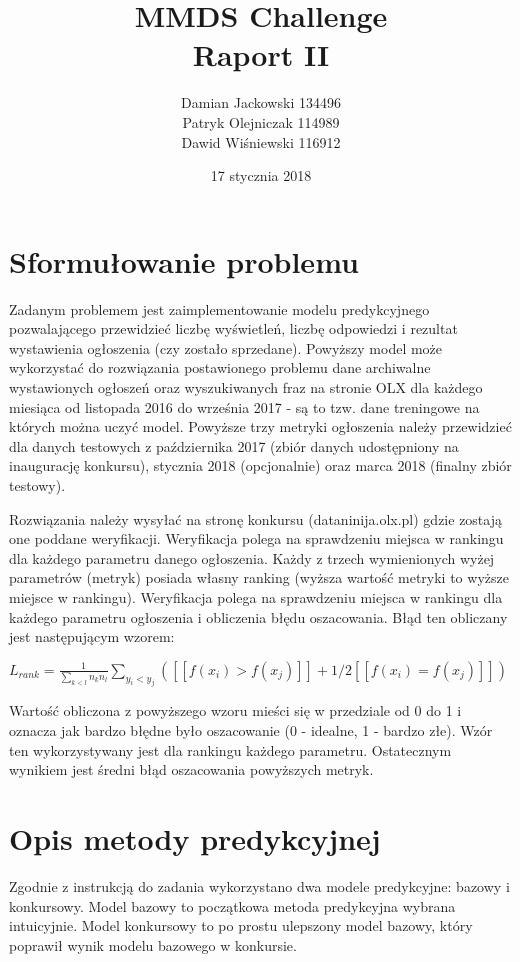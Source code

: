 \documentclass[a4paper,11pt]{article}
\author{Damian Jackowski 134496 \\ Patryk Olejniczak 114989 \\ Dawid Wiśniewski 116912}
\title{MMDS Challenge\\
	\large{{\bf Raport II}  }}
\date{17 stycznia 2018}
\begin{document}
\maketitle 


\section{Sformułowanie problemu}

Zadanym problemem jest zaimplementowanie modelu predykcyjnego pozwalającego przewidzieć  liczbę wyświetleń, liczbę odpowiedzi i rezultat wystawienia ogłoszenia (czy zostało sprzedane). Powyższy model może wykorzystać do rozwiązania postawionego problemu dane archiwalne wystawionych ogłoszeń oraz wyszukiwanych fraz na stronie OLX dla każdego miesiąca od listopada 2016 do września 2017 - są to tzw. dane treningowe na których można uczyć model. Powyższe trzy metryki ogłoszenia należy przewidzieć dla danych testowych z października 2017 (zbiór danych udostępniony na inaugurację konkursu), stycznia 2018 (opcjonalnie) oraz marca 2018 (finalny zbiór testowy).

Rozwiązania należy wysyłać na stronę konkursu (dataninija.olx.pl) gdzie zostają one poddane weryfikacji. Weryfikacja polega na sprawdzeniu miejsca w rankingu dla każdego parametru danego ogłoszenia. Każdy z trzech wymienionych wyżej parametrów (metryk) posiada własny ranking (wyższa wartość metryki to wyższe miejsce w rankingu). Weryfikacja polega na sprawdzeniu miejsca w rankingu dla każdego parametru ogłoszenia i obliczenia błędu oszacowania. Błąd ten obliczany jest następującym wzorem:

$L_{rank} = \frac{1}{\sum_{k < l} n_k n_l} \sum_{y_i < y_j} \left ( [[ f(x_i) > f(x_j) ]] + 1/2 [[ f(x_i) = f(x_j) ]] \right )$

Wartość obliczona z powyższego wzoru mieści się w przedziale od 0 do 1 i oznacza jak bardzo błędne było oszacowanie (0 - idealne, 1 - bardzo złe). Wzór ten wykorzystywany jest dla rankingu każdego parametru. Ostatecznym wynikiem jest średni błąd oszacowania powyższych metryk.

\section{Opis metody predykcyjnej}

Zgodnie z instrukcją do zadania wykorzystano dwa modele predykcyjne: bazowy i konkursowy. Model bazowy to początkowa metoda predykcyjna wybrana intuicyjnie. Model konkursowy to po prostu ulepszony model bazowy, który poprawił wynik modelu bazowego w konkursie.
\end{document}
